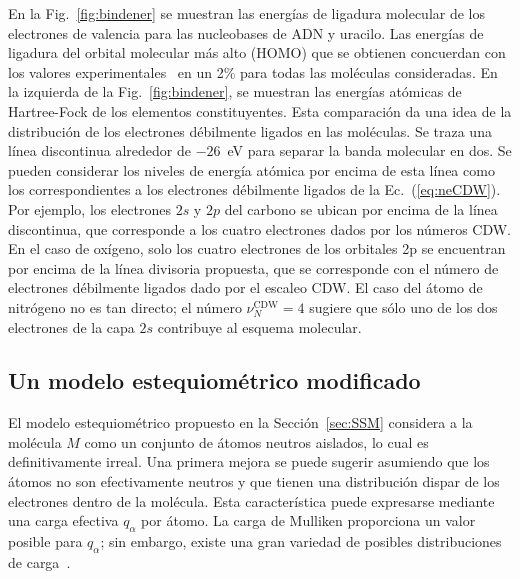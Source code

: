 En la Fig.~\ref{fig:bindener} se muestran las energías de ligadura 
molecular de los electrones de valencia para las nucleobases de ADN y 
uracilo. Las energías de ligadura del orbital molecular más alto (HOMO) 
que se obtienen concuerdan con los valores 
experimentales~\cite{Hush,Verkin,Dougherty} en un 2\% para todas las 
moléculas consideradas. En la izquierda de la Fig.~\ref{fig:bindener}, 
se muestran las energías atómicas de Hartree-Fock de los elementos 
constituyentes. Esta comparación da una idea de la distribución de los 
electrones débilmente ligados en las moléculas. Se traza una línea 
discontinua alrededor de $-26$~eV para separar la banda molecular en 
dos. Se pueden considerar los niveles de energía atómica por encima de 
esta línea como los correspondientes a los electrones débilmente ligados 
de la Ec.~(\ref{eq:neCDW}). Por ejemplo, los electrones $2s$ y $2p$ del 
carbono se ubican por encima de la línea discontinua, que corresponde a 
los cuatro electrones dados por los números CDW. En el caso de oxígeno, 
solo los cuatro electrones de los orbitales 2p se encuentran por encima 
de la línea divisoria propuesta, que se corresponde con el número de 
electrones débilmente ligados dado por el escaleo CDW. El caso del átomo 
de nitrógeno no es tan directo; el número $\nu_{N}^{\text{CDW}}=4$ 
sugiere que sólo uno de los dos electrones de la capa $2s$ contribuye al 
esquema molecular.

\subsection{Un modelo estequiométrico modificado}

El modelo estequiométrico propuesto en la Sección~\ref{sec:SSM} 
considera a la molécula $M$ como un conjunto de átomos neutros aislados, 
lo cual es definitivamente irreal. Una primera mejora se puede sugerir 
asumiendo que los átomos no son efectivamente neutros y que tienen una 
distribución dispar de los electrones dentro de la molécula. Esta 
característica puede expresarse mediante una carga efectiva $q_{\alpha}$ 
por átomo. La carga de Mulliken proporciona un valor posible para 
$q_{\alpha}$; sin embargo, existe una gran variedad de posibles 
distribuciones de carga~\cite{lee2003}.

